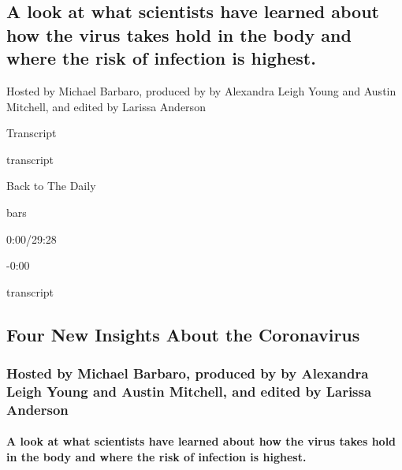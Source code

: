 \hypertarget{a-look-at-what-scientists-have-learned-about-how-the-virus-takes-hold-in-the-body-and-where-the-risk-of-infection-is-highest-1}{%
\subsection{A look at what scientists have learned about how the virus
takes hold in the body and where the risk of infection is
highest.}\label{a-look-at-what-scientists-have-learned-about-how-the-virus-takes-hold-in-the-body-and-where-the-risk-of-infection-is-highest-1}}

Hosted by Michael Barbaro, produced by by Alexandra Leigh Young and
Austin Mitchell, and edited by Larissa Anderson

Transcript

transcript

Back to The Daily

bars

0:00/29:28

-0:00

transcript

\hypertarget{four-new-insights-about-the-coronavirus-2}{%
\subsection{Four New Insights About the
Coronavirus}\label{four-new-insights-about-the-coronavirus-2}}

\hypertarget{hosted-by-michael-barbaro-produced-by-by-alexandra-leigh-young-and-austin-mitchell-and-edited-by-larissa-anderson-1}{%
\subsubsection{Hosted by Michael Barbaro, produced by by Alexandra Leigh
Young and Austin Mitchell, and edited by Larissa
Anderson}\label{hosted-by-michael-barbaro-produced-by-by-alexandra-leigh-young-and-austin-mitchell-and-edited-by-larissa-anderson-1}}

\hypertarget{a-look-at-what-scientists-have-learned-about-how-the-virus-takes-hold-in-the-body-and-where-the-risk-of-infection-is-highest-2}{%
\paragraph{A look at what scientists have learned about how the virus
takes hold in the body and where the risk of infection is
highest.}\label{a-look-at-what-scientists-have-learned-about-how-the-virus-takes-hold-in-the-body-and-where-the-risk-of-infection-is-highest-2}}

